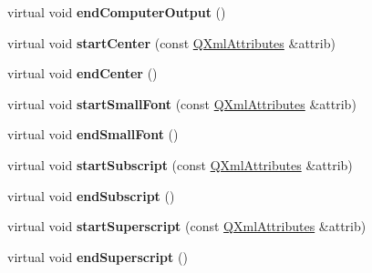 \begin{DoxyCompactItemize}
\item 
\hypertarget{class_markup_handler_adcfd33d9c5287f140244c720113a8cf0}{virtual void {\bfseries end\-Computer\-Output} ()}\label{class_markup_handler_adcfd33d9c5287f140244c720113a8cf0}

\item 
\hypertarget{class_markup_handler_a463b21644cadab009299d81e737cf7cf}{virtual void {\bfseries start\-Center} (const \hyperlink{class_q_xml_attributes}{Q\-Xml\-Attributes} \&attrib)}\label{class_markup_handler_a463b21644cadab009299d81e737cf7cf}

\item 
\hypertarget{class_markup_handler_a3e879450d54b627a5d86065b831ca0ac}{virtual void {\bfseries end\-Center} ()}\label{class_markup_handler_a3e879450d54b627a5d86065b831ca0ac}

\item 
\hypertarget{class_markup_handler_a70b1c40b4d13fd3e783525a5bac8638a}{virtual void {\bfseries start\-Small\-Font} (const \hyperlink{class_q_xml_attributes}{Q\-Xml\-Attributes} \&attrib)}\label{class_markup_handler_a70b1c40b4d13fd3e783525a5bac8638a}

\item 
\hypertarget{class_markup_handler_afc1a751e22c0af28d6b29a259d1506d2}{virtual void {\bfseries end\-Small\-Font} ()}\label{class_markup_handler_afc1a751e22c0af28d6b29a259d1506d2}

\item 
\hypertarget{class_markup_handler_aa4d880b7f129c8ef2e9039fd1b7d2ff0}{virtual void {\bfseries start\-Subscript} (const \hyperlink{class_q_xml_attributes}{Q\-Xml\-Attributes} \&attrib)}\label{class_markup_handler_aa4d880b7f129c8ef2e9039fd1b7d2ff0}

\item 
\hypertarget{class_markup_handler_af39bf393a482165d89403843ec1504ec}{virtual void {\bfseries end\-Subscript} ()}\label{class_markup_handler_af39bf393a482165d89403843ec1504ec}

\item 
\hypertarget{class_markup_handler_aeaa0a2b35af043f590836b6f5f300de2}{virtual void {\bfseries start\-Superscript} (const \hyperlink{class_q_xml_attributes}{Q\-Xml\-Attributes} \&attrib)}\label{class_markup_handler_aeaa0a2b35af043f590836b6f5f300de2}

\item 
\hypertarget{class_markup_handler_a1da4da5cd6d06ee545b340a77b3f52d2}{virtual void {\bfseries end\-Superscript} ()}\label{class_markup_handler_a1da4da5cd6d06ee545b340a77b3f52d2}


\end{DoxyCompactItemize}
